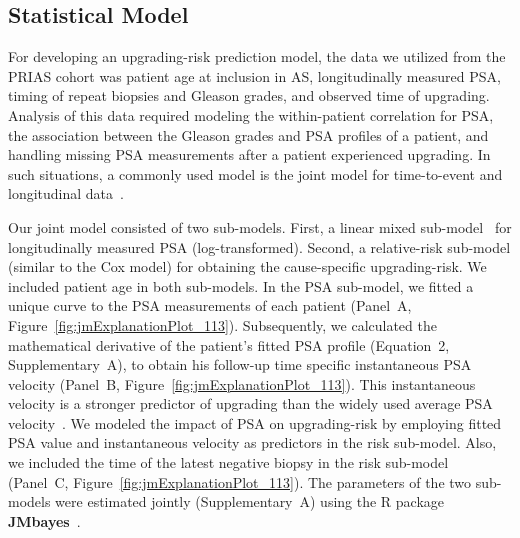 \subsection{Statistical Model}
For developing an upgrading-risk prediction model, the data we utilized from the PRIAS cohort was patient age at inclusion in AS, longitudinally measured PSA, timing of repeat biopsies and Gleason grades, and observed time of upgrading. Analysis of this data required modeling the within-patient correlation for PSA, the association between the Gleason grades and PSA profiles of a patient, and handling missing PSA measurements after a patient experienced upgrading. In such situations, a commonly used model is the joint model for time-to-event and longitudinal data~\citep{tomer2019,coley2017prediction,rizopoulos2012joint}.

Our joint model consisted of two sub-models. First, a linear mixed sub-model~\citep{laird1982random} for longitudinally measured PSA (log-transformed). Second, a relative-risk sub-model (similar to the Cox model) for obtaining the cause-specific upgrading-risk. We included patient age in both sub-models. In the PSA sub-model, we fitted a unique curve to the PSA measurements of each patient (Panel~A, Figure~\ref{fig:jmExplanationPlot_113}). Subsequently, we calculated the mathematical derivative of the patient's fitted PSA profile (Equation~2, Supplementary~A), to obtain his follow-up time specific instantaneous PSA velocity (Panel~B, Figure~\ref{fig:jmExplanationPlot_113}). This instantaneous velocity is a stronger predictor of upgrading than the widely used average PSA velocity~\citep{cooperberg2018refined}. We modeled the impact of PSA on upgrading-risk by employing fitted PSA value and instantaneous velocity as predictors in the risk sub-model. Also, we included the time of the latest negative biopsy in the risk sub-model (Panel~C, Figure~\ref{fig:jmExplanationPlot_113}). The parameters of the two sub-models were estimated jointly (Supplementary~A) using the R package \textbf{JMbayes}~\citep{rizopoulosJMbayes}. 

